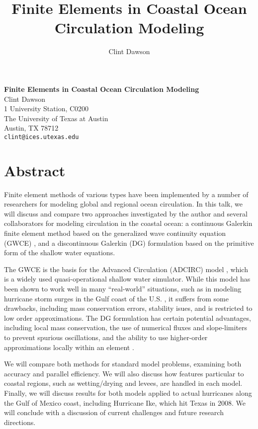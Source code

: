 \title{Finite Elements in Coastal Ocean Circulation Modeling}
\author{Clint Dawson} 

\begin{center}

\textbf{\Large Finite Elements in Coastal Ocean Circulation Modeling}\\
\vspace{10mm}
{\large Clint Dawson}\\
1 University Station, C0200 \\
The University of Texas at Austin \\
Austin, TX  78712 \\
{\tt clint@ices.utexas.edu}

\end{center}

\section*{Abstract}

Finite element methods of various types have been implemented by a number of researchers for modeling global and regional ocean circulation.  In this talk, we will discuss and compare two approaches investigated by the author and several collaborators for modeling circulation in the coastal ocean: a continuous Galerkin finite element method based on the generalized wave continuity equation (GWCE) \cite{LynchGray79}, and a discontinuous Galerkin (DG) formulation \cite{ad1,kub} based on the primitive form of the shallow water equations.

The GWCE is the basis for the Advanced Circulation (ADCIRC) model \cite{Luettich92}, which is a widely used quasi-operational shallow water simulator.    While this model has been shown to work well in many ``real-world'' situations, such as in modeling hurricane storm surges in the Gulf coast of the U.S. \cite{bunya,dietrich,MWR-Gustav}, it suffers from some drawbacks, including mass conservation errors, stability isues, and is restricted to low order approximations.  The DG formulation has certain potential advantages, including local mass conservation, the use of numerical fluxes and slope-limiters to prevent spurious oscillations, and the ability to use higher-order approximations locally within an element \cite{kub-p}.

We will compare both methods for standard model problems, examining both accuracy and parallel efficiency.  We will also discuss how features particular to coastal regions, such as wetting/drying and levees, are handled in each model. Finally, we will discuss results for both models  applied to actual hurricanes along the Gulf of Mexico coast, including Hurricane Ike, which hit Texas in 2008.  We will conclude with a discussion of current challenges and future research directions.

